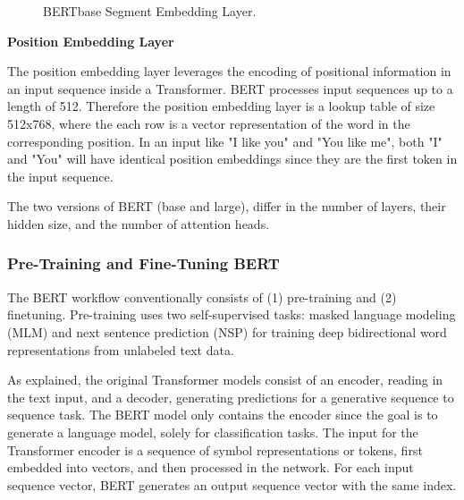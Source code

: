 \begin{figure}
    \caption{BERTbase Segment Embedding Layer.}
    \label{fig:BERT_segmentEmbedding}
\end{figure}


\textbf{Position Embedding Layer}

The position embedding layer leverages the encoding of positional information in an input sequence inside a Transformer. BERT processes input sequences up to a length of 512. Therefore the position embedding layer is a lookup table of size 512x768, where the each row is a vector representation of the word in the corresponding position. In an input like "I like you" and "You like me", both "I" and "You" will have identical position embeddings since they are the first token in the input sequence. 

The two versions of BERT (base and large), differ in the number of layers, their hidden size, and the number of attention heads.  

\subsubsection{Pre-Training and Fine-Tuning BERT}
    \label{sec:bert_pre-fine}
The BERT workflow conventionally consists of (1) pre-training and (2) finetuning. Pre-training uses two self-supervised tasks: masked language modeling (MLM) and next sentence prediction (NSP) for training deep bidirectional word representations from unlabeled text data.

As explained, the original Transformer models consist of an encoder, reading in the text input, and a decoder, generating predictions for a generative sequence to sequence task. The BERT model only contains the encoder since the goal is to generate a language model, solely for classification tasks.
The input for the Transformer encoder is a sequence of symbol representations or tokens, first embedded into vectors, and then processed in the network. For each input sequence vector, BERT generates an output sequence vector with the same index.

